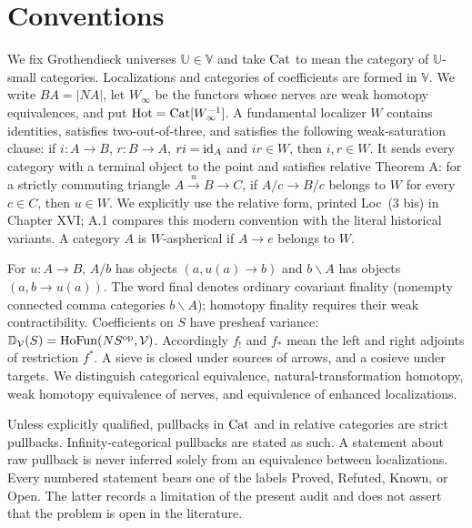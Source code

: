 \section*{Conventions}
We fix Grothendieck universes $\mathbb U\in\mathbb V$ and take $\mathrm{Cat}$ to mean the category of $\mathbb U$-small categories. Localizations and categories of coefficients are formed in $\mathbb V$. We write $BA=|NA|$, let $W_\infty$ be the functors whose nerves are weak homotopy equivalences, and put $\mathrm{Hot}=\mathrm{Cat}[W_\infty^{-1}]$. A fundamental localizer $W$ contains identities, satisfies two-out-of-three, and satisfies the following weak-saturation clause: if $i:A\to B$, $r:B\to A$, $ri=\mathrm{id}_A$ and $ir\in W$, then $i,r\in W$. It sends every category with a terminal object to the point and satisfies relative Theorem A: for a strictly commuting triangle $A\xrightarrow{u}B\to C$, if $A/c\to B/c$ belongs to $W$ for every $c\in C$, then $u\in W$. We explicitly use the relative form, printed Loc~(3 bis) in Chapter XVI; A.1 compares this modern convention with the literal historical variants. A category $A$ is $W$-aspherical if $A\to e$ belongs to $W$.

For $u:A\to B$, $A/b$ has objects $(a,u(a)\to b)$ and $b\backslash A$ has objects $(a,b\to u(a))$. The word final denotes ordinary covariant finality (nonempty connected comma categories $b\backslash A$); homotopy finality requires their weak contractibility. Coefficients on $S$ have presheaf variance: $\mathbb D_{\mathcal V}(S)=\mathrm{Ho}\mathrm{Fun}(NS^{\mathrm{op}},\mathcal V)$. Accordingly $f_!$ and $f_*$ mean the left and right adjoints of restriction $f^*$. A sieve is closed under sources of arrows, and a cosieve under targets. We distinguish categorical equivalence, natural-transformation homotopy, weak homotopy equivalence of nerves, and equivalence of enhanced localizations.

Unless explicitly qualified, pullbacks in $\mathrm{Cat}$ and in relative categories are strict pullbacks. Infinity-categorical pullbacks are stated as such. A statement about raw pullback is never inferred solely from an equivalence between localizations. Every numbered statement bears one of the labels Proved, Refuted, Known, or Open. The latter records a limitation of the present audit and does not assert that the problem is open in the literature.
